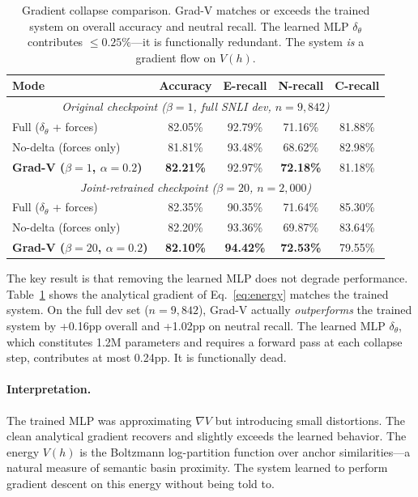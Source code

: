 \documentclass[11pt]{article}
\begin{document}
\begin{table}[ht]
\centering
\begin{tabular}{@{}lcccc@{}}
\toprule
Mode & Accuracy & E-recall & N-recall & C-recall \\
\midrule
\multicolumn{5}{c}{\textit{Original checkpoint ($\beta=1$, full SNLI dev, $n=9{,}842$)}} \\
\midrule
Full ($\delta_\theta$ + forces) & 82.05\% & 92.79\% & 71.16\% & 81.88\% \\
No-delta (forces only) & 81.81\% & 93.48\% & 68.62\% & 82.98\% \\
\textbf{Grad-V ($\beta=1$, $\alpha=0.2$)} & \textbf{82.21\%} & 92.97\% & \textbf{72.18\%} & 81.18\% \\
\midrule
\multicolumn{5}{c}{\textit{Joint-retrained checkpoint ($\beta=20$, $n=2{,}000$)}} \\
\midrule
Full ($\delta_\theta$ + forces) & 82.35\% & 90.35\% & 71.64\% & 85.30\% \\
No-delta (forces only) & 82.20\% & 93.36\% & 69.87\% & 83.64\% \\
\textbf{Grad-V ($\beta=20$, $\alpha=0.2$)} & \textbf{82.10\%} & \textbf{94.42\%} & \textbf{72.53\%} & 79.55\% \\
\bottomrule
\end{tabular}
\caption{Gradient collapse comparison. Grad-V matches or exceeds the
trained system on overall accuracy and neutral recall. The learned MLP
$\delta_\theta$ contributes $\leq 0.25\%$---it is functionally redundant.
The system \emph{is} a gradient flow on $V(h)$.}
\label{tab:collapse}
\end{table}

The key result is that removing the learned MLP does not degrade
performance. Table~\ref{tab:collapse} shows the analytical gradient
of Eq.~\ref{eq:energy} matches the trained system. On the full dev set
($n=9{,}842$), Grad-V actually \emph{outperforms} the trained system by
+0.16pp overall and +1.02pp on neutral recall. The learned MLP
$\delta_\theta$, which constitutes 1.2M parameters and requires a
forward pass at each collapse step, contributes at most 0.24pp. It is
functionally dead.

\paragraph{Interpretation.}
The trained MLP was approximating $\nabla V$ but introducing small
distortions. The clean analytical gradient recovers and slightly exceeds
the learned behavior. The energy $V(h)$ is the Boltzmann log-partition
function over anchor similarities---a natural measure of semantic basin
proximity. The system learned to perform gradient descent on this energy
without being told to.
\end{document}
